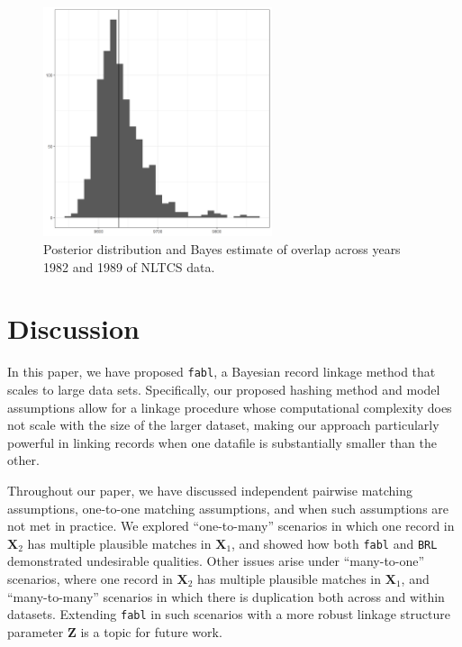 \documentclass[ba]{imsart}
\begin{document}
\begin{figure}[t]
	\begin{center}
		\includegraphics[width=0.6\textwidth]{../notes/figures/nltcs/overlap_posterior4}
		\caption{Posterior distribution and Bayes estimate of overlap across years 1982 and 1989 of NLTCS data.}
		\label{fig:overlap-plot}
	\end{center}
\end{figure}

\section{Discussion}
\label{discussion}

In this paper, we have proposed \texttt{fabl}, a Bayesian record linkage method that scales to large data sets. Specifically, our proposed hashing method
and model assumptions allow for a linkage procedure whose computational complexity does not scale with the size of the larger dataset, making our approach particularly powerful in linking records when one datafile is substantially smaller than the other.

Throughout our paper, we have discussed independent pairwise matching assumptions, one-to-one matching assumptions, and when such assumptions are not met in practice. We explored ``one-to-many'' scenarios in which one record in $\bm{X}_2$ has multiple plausible matches in $\bm{X}_1$, and showed how both \texttt{fabl} and \texttt{BRL} demonstrated undesirable qualities. Other issues arise under ``many-to-one'' scenarios, where one record in $\bm{X}_2$ has multiple plausible matches in $\bm{X}_1$, and ``many-to-many'' scenarios in which there is duplication both across and within datasets. Extending \texttt{fabl} in such scenarios with a more robust linkage structure parameter $\bm{Z}$ is a topic for future work. 
\end{document}
